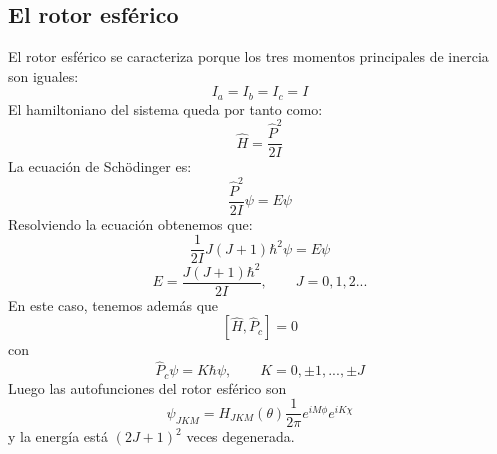 \documentclass[a4paper]{article}
\begin{document}
\subsection{El rotor esférico}
El rotor esférico se caracteriza porque los tres momentos principales de inercia son iguales: $$I_a=I_b=I_c= I$$
El hamiltoniano del sistema queda por tanto como:
\begin{equation}
\hat H = \frac{\hat P^2}{2I}
\end{equation}
La ecuación de Schödinger es:
\begin{equation}
\frac{\hat P^2}{2I} \psi = E\psi
\end{equation}
Resolviendo la ecuación obtenemos que:$$\frac{1}{2I}J(J+1)\hbar^2\psi=E\psi$$
\begin{equation}
E=\frac{J(J+1)\hbar^2}{2I}, \qquad J=0,1,2...
\end{equation}
En este caso, tenemos además que
\begin{equation}
\left[\hat H,\hat P_c \right]=0
\end{equation}
con $$\hat P_c \psi = K\hbar\psi, \qquad K = 0, \pm 1,..., \pm J$$
Luego las autofunciones del rotor esférico son
\begin{equation}
\psi_{JKM}=H_{JKM}(\theta)\frac{1}{2\pi}e^{iM\phi}e^{iK\chi}
\end{equation}
y la energía está $(2J+1)^2$ veces degenerada.
\end{document}
